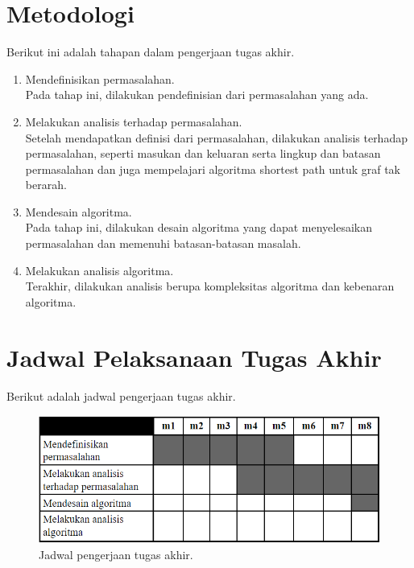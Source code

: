 \section{Metodologi}

Berikut ini adalah tahapan dalam pengerjaan tugas akhir.

\begin{enumerate}
    \item Mendefinisikan permasalahan.\\
    Pada tahap ini, dilakukan pendefinisian dari permasalahan yang ada.
    \item Melakukan analisis terhadap permasalahan.\\
    Setelah mendapatkan definisi dari permasalahan, dilakukan analisis terhadap permasalahan, seperti masukan dan keluaran serta lingkup dan batasan permasalahan dan juga mempelajari algoritma shortest path untuk graf tak berarah.
    \item Mendesain algoritma.\\
    Pada tahap ini, dilakukan desain algoritma yang dapat menyelesaikan permasalahan dan memenuhi batasan-batasan masalah.
    \item Melakukan analisis algoritma.\\
    Terakhir, dilakukan analisis berupa kompleksitas algoritma dan kebenaran algoritma.
\end{enumerate}

\section{Jadwal Pelaksanaan Tugas Akhir}

Berikut adalah jadwal pengerjaan tugas akhir.

\begin{figure}[h]
    \centering
    \includegraphics[width=1.0\textwidth]{resources/jadwa_pengerjaan.png}
    \caption{Jadwal pengerjaan tugas akhir.}
\end{figure}

